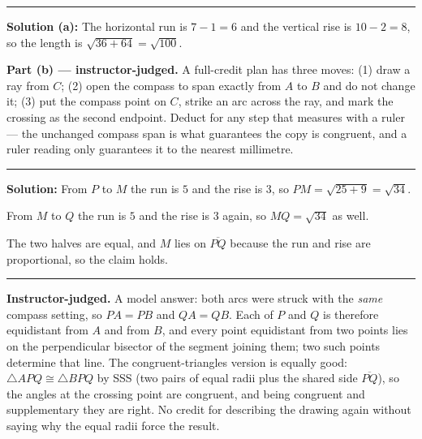 \documentclass[12pt]{article}
\begin{document}



\vspace{0.3cm}
\noindent\rule{\linewidth}{0.4pt}
\vspace{0.2cm}


\textbf{Solution (a):} The horizontal run is $7 - 1 = 6$ and the vertical rise is
$10 - 2 = 8$, so the length is $\sqrt{36 + 64} = \sqrt{100}$. 

\textbf{Part (b) --- instructor-judged.} A full-credit plan has three moves:
(1) draw a ray from $C$; (2) open the compass to span exactly from $A$ to $B$
and do not change it; (3) put the compass point on $C$, strike an arc across the
ray, and mark the crossing as the second endpoint. Deduct for any step that
measures with a ruler --- the unchanged compass span is what guarantees the copy
is congruent, and a ruler reading only guarantees it to the nearest millimetre.

\vspace{0.15cm}
\noindent\rule{\linewidth}{0.2pt}


\textbf{Solution:} From $P$ to $M$ the run is $5$ and the rise is $3$, so
$PM = \sqrt{25 + 9} = \sqrt{34}$. 

From $M$ to $Q$ the run is $5$ and the rise is $3$ again, so $MQ = \sqrt{34}$
as well. 

\noindent The two halves are equal, and $M$ lies on $\overline{PQ}$ because the
run and rise are proportional, so the claim holds.

\vspace{0.15cm}
\noindent\rule{\linewidth}{0.2pt}


\textbf{Instructor-judged.} A model answer: both arcs were struck with the
\emph{same} compass setting, so $PA = PB$ and $QA = QB$. Each of $P$ and $Q$ is
therefore equidistant from $A$ and from $B$, and every point equidistant from
two points lies on the perpendicular bisector of the segment joining them; two
such points determine that line. The congruent-triangles version is equally
good: $\triangle APQ \cong \triangle BPQ$ by SSS (two pairs of equal radii plus
the shared side $\overline{PQ}$), so the angles at the crossing point are
congruent, and being congruent and supplementary they are right. No credit for
describing the drawing again without saying why the equal radii force the
result.
\end{document}
